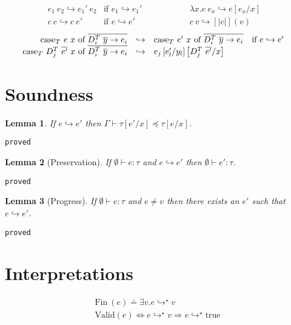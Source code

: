 \documentclass[10pt,a4paper]{article}
\newtheorem{lemma}{Lemma}
\newcommand\showproof[1]{\texttt{proved}}
\newcommand\dcti{\dct{i}}
\newcommand\dct[1]{\ensuremath{D^T_{#1}}}
\newcommand\efun[2]{\ensuremath{\lambda #1 . #2}}
\newcommand\eapp[2]{\ensuremath{#1 \ #2}}
\newcommand\edata[2]{\ensuremath{#1 \ #2}}
\newcommand\ecase[5]{\ensuremath{\text{case}_T\ #1\ #2\ \text{of}\ \overline{\edata{#3}{#4} \rightarrow #5}}}
\newcommand\etrue{\ensuremath{\text{true}}}
\newcommand\fin[1]{\ensuremath{\text{Fin}\ (#1)}}
\newcommand\valid[1]{\ensuremath{\text{Valid}(#1)}}
\newcommand\sub[2]{\ensuremath{\left[ #2 / #1 \right]}}
\newcommand\eval[2]{\ensuremath{#1 \hookrightarrow #2}}
\newcommand\evals[2]{\ensuremath{#1 \hookrightarrow^\star #2}}
\newcommand\hastype[3]{\ensuremath{#1 \vdash #2 : #3}}
\newcommand\issubtype[3]{\ensuremath{#1 \vdash #2 \preceq #3}}
\begin{document}
$$
\begin{array}{lllll}
\eval{\eapp{e_1}{e_2}}{\eapp{e_1'}{e_2}} & \text{if } \eval{e_1}{e_1'}&\qquad\qquad&
\eval{\eapp{\efun{x}{e}}{e_x}}{e\sub{x}{e_x}} &\\
\eval{\eapp{c}{e}}{\eapp{c}{e'}} & \text{if } \eval{e}{e'} &\qquad\qquad&
\eval{\eapp{c}{v}}{[|c|](v)} &
\end{array}
$$
$$
\begin{array}{rllll}
\eval{\ecase{e}{x}{\dcti}{\overline{y}}{e_i}&}
	 {&\ecase{e'}{x}{\dcti}{\overline{y}}{e_i}} & \text{if } \eval{e}{e'} &\\
\eval	{\ecase{\eapp{\dct{j}}{\overline{e'}}}{x}{\dcti}{\overline{y}}{e_i}&}
		{&e_j\sub{y_l}{e'_l}\sub{x}{\eapp{\dct{j}}{\overline{e'}}}} &
\end{array}
$$

\section*{Soundness}
\begin{lemma}\label{lemma:eval}
If \eval{e}{e'} then \issubtype{\Gamma}{\tau\sub{x}{e'}}{\tau\sub{x}{e}}.
\end{lemma}
\showproof{
	\begin{proof}
	
	\end{proof}
}

\begin{lemma}[Preservation]\label{lemma:preservation}
If \hastype{\emptyset}{e}{\tau} and \eval{e}{e'} then \hastype{\emptyset}{e'}{\tau}.
\end{lemma}
\showproof{
	\begin{proof}
	
	\end{proof}
}
\begin{lemma}[Progress]\label{lemma:progress}
If \hastype{\emptyset}{e}{\tau} and $e \neq v$ then there exists an $e'$ such that \eval{e}{e'}.
\end{lemma}
\showproof{
	\begin{proof}
	
	\end{proof}
}

\section*{Interpretations}
\begin{align*}
\fin{e} \doteq \exists v. \evals{e}{v}\\
\valid{e} \Leftrightarrow \evals{e}{v}\Rightarrow\evals{e}{\etrue}
\end{align*}
\end{document}
